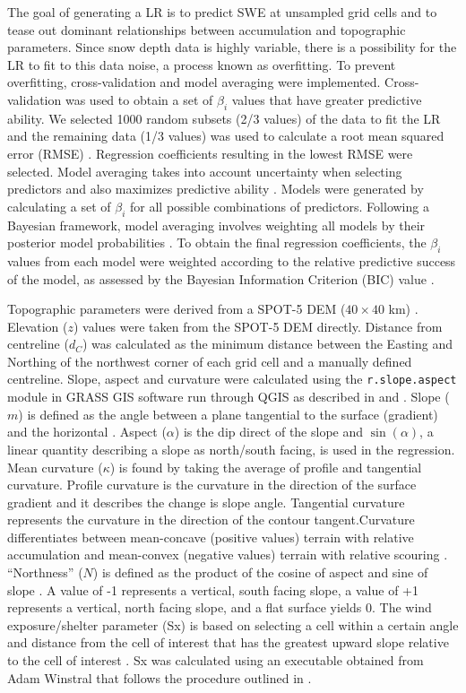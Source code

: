 \documentclass[twocolumn,letterpaper]{igs}
\begin{document}
The goal of generating a LR is to predict SWE at unsampled grid cells and to tease out dominant relationships between accumulation and topographic parameters. Since snow depth data is highly variable, there is a possibility for the LR to fit to this data noise, a process known as overfitting. To prevent overfitting, cross-validation and model averaging were implemented. Cross-validation was used to obtain a set of $\beta_i$ values that have greater predictive ability. We selected 1000 random subsets (2/3 values) of the data to fit the LR and the remaining data (1/3 values) was used to calculate a root mean squared error (RMSE) \citep{Kohavi1995}. Regression coefficients resulting in the lowest RMSE were selected. Model averaging takes into account uncertainty when selecting predictors and also maximizes predictive ability \citep{Madigan1994}. Models were generated by calculating a set of $\beta_i$ for all possible combinations of predictors. Following a Bayesian framework, model averaging involves weighting all models by their posterior model probabilities \citep{Raftery1997}. To obtain the final regression coefficients, the $\beta_i$ values from each model were weighted according to the relative predictive success of the model, as assessed by the Bayesian Information Criterion (BIC) value \citep{Burnham2004}.

Topographic parameters were derived from a SPOT-5 DEM ($40\times40$ km) \citep{Korona2009}. Elevation ($z$) values were taken from the SPOT-5 DEM directly. Distance from centreline ($d_C$) was calculated as the minimum distance between the Easting and Northing of the northwest corner of each grid cell and a manually defined centreline. Slope, aspect and curvature were calculated using the \texttt{r.slope.aspect} module in GRASS GIS software run through QGIS as described in \cite{Mitavsova1993} and \cite{Hofierka2009}. Slope ($m$) is defined as the angle between a plane tangential to the surface (gradient) and the horizontal \citep{Olaya2009}. Aspect ($\alpha$) is the dip direct of the slope and $\sin(\alpha)$, a linear quantity describing a slope as north/south facing, is used in the regression. Mean curvature ($\kappa$) is found by taking the average of profile and tangential curvature. Profile curvature is the curvature in the direction of the surface gradient and it describes the change is slope angle. Tangential curvature represents the curvature in the direction of the contour tangent.Curvature differentiates between mean-concave (positive values) terrain with relative accumulation and mean-convex (negative values) terrain with relative scouring \citep{Olaya2009}. ``Northness'' ($N$) is defined as the product of the cosine of aspect and sine of slope \citep{Molotch2005}. A value of -1 represents a vertical, south facing slope, a value of +1 represents a vertical, north facing slope, and a flat surface yields 0. The wind exposure/shelter parameter (Sx) is based on selecting a cell within a certain angle and distance from the cell of interest that has the greatest upward slope relative to the cell of interest \citep{Winstral2002}. Sx was calculated using an executable obtained from Adam Winstral that follows the procedure outlined in \cite{Winstral2002}. 
\end{document}
